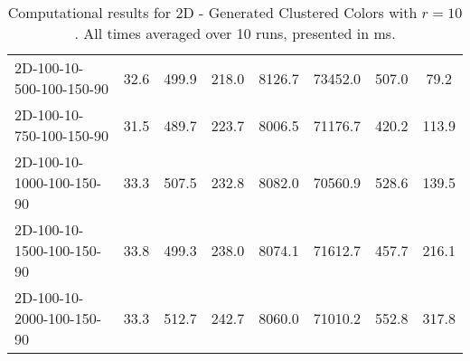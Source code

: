 \documentclass{article}
\begin{document}
\begin{center}
\begin{table}[h]
\begin{tabular}{|l||c|c|c|c|c|c|c|}
            2D-100-10-500-100-150-90       & 32.6 & 499.9     & 218.0      & 8126.7      & 73452.0  & 507.0     & 79.2       \\
            2D-100-10-750-100-150-90       & 31.5 & 489.7     & 223.7      & 8006.5      & 71176.7  & 420.2     & 113.9      \\
            2D-100-10-1000-100-150-90      & 33.3 & 507.5     & 232.8      & 8082.0      & 70560.9  & 528.6     & 139.5      \\
            2D-100-10-1500-100-150-90      & 33.8 & 499.3     & 238.0      & 8074.1      & 71612.7  & 457.7     & 216.1      \\
            2D-100-10-2000-100-150-90      & 33.3 & 512.7     & 242.7      & 8060.0      & 71010.2  & 552.8     & 317.8      \\
            \hline
        \end{tabular}
        \caption{Computational results for 2D - Generated Clustered Colors with $r=10$. All times averaged over 10 runs, presented in ms.}
    \end{table}
\end{center}
\end{document}
